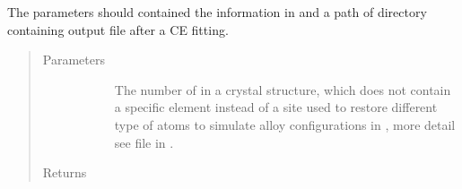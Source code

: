 \documentclass[letterpaper,10pt,english]{sphinxmanual}
\begin{document}
\begin{fulllineitems}
\begin{fulllineitems}
The parameters should contained the  information in 
and a path of directory containing output file after a CE fitting.
\begin{quote}\begin{description}
\item[{Parameters}] \leavevmode\begin{description}
\item[{}] \leavevmode
The number of  in a crystal structure, which does not
contain a specific element instead of a site used to restore
different type of atoms to simulate alloy configurations in
, more detail see  file in .

\item[{}] \leavevmode
\end{description}

\item[{Returns}] \leavevmode\begin{description}
\item[{}] \leavevmode
\end{description}

\end{description}\end{quote}

\end{fulllineitems}


\end{fulllineitems}

\end{document}
